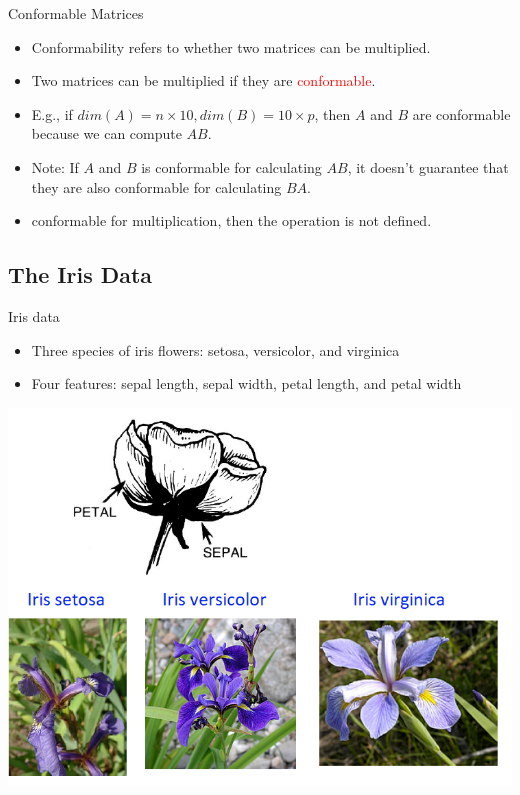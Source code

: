 \documentclass[
  ignorenonframetext,
]{beamer}
\providecommand{\tightlist}{%
  \setlength{\itemsep}{0pt}\setlength{\parskip}{0pt}}
\begin{document}
\begin{frame}{Conformable Matrices}
\protect\hypertarget{conformable-matrices}{}
\begin{itemize}
\tightlist
\item
  Conformability refers to whether two matrices can be multiplied.\\
\item
  Two matrices can be multiplied if they are
  \textcolor{red}{conformable}.\\
\item
  E.g., if \(dim(A)=n\times 10, dim(B)=10\times p\), then \(A\) and
  \(B\) are conformable because we can compute \(AB\).
\item
  Note: If \(A\) and \(B\) is conformable for calculating \(AB\), it
  doesn't guarantee that they are also conformable for calculating
  \(BA\).
\item
  conformable for multiplication, then the operation is not defined.
\end{itemize}
\end{frame}

\hypertarget{the-iris-data}{%
\subsection{The Iris Data}\label{the-iris-data}}

\begin{frame}{Iris data}
\protect\hypertarget{iris-data}{}
\begin{itemize}
\tightlist
\item
  Three species of iris flowers: setosa, versicolor, and virginica
\item
  Four features: sepal length, sepal width, petal length, and petal
  width
\end{itemize}

\includegraphics[width=0.6\linewidth]{img/iris}
\end{frame}
\end{document}
